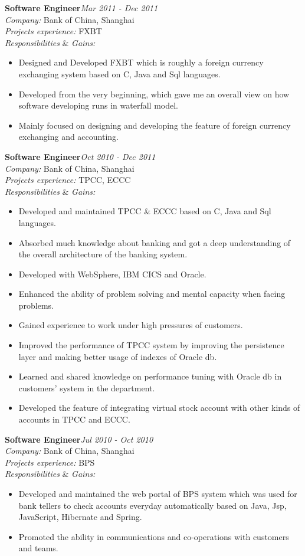 \documentclass[line, margin, 11pt]{res}
\begin{document}
\begin{resume}
{\bf Software Engineer}\hfill {\it Mar 2011 - Dec 2011}\\
{\sl Company:} Bank of China, Shanghai\\
{\sl Projects experience:} FXBT\\
{\sl Responsibilities} \& {\sl Gains:}
\begin{itemize}
\item Designed and Developed FXBT which is roughly a foreign currency exchanging system based on C, Java and Sql languages.
\item Developed from the very beginning, which gave me an overall view on how software developing runs in waterfall model.
\item Mainly focused on designing and developing the feature of foreign currency exchanging and accounting.
\end{itemize}

\pagebreak
{\bf Software Engineer}\hfill {\it Oct 2010 - Dec 2011}\\
{\sl Company:} Bank of China, Shanghai\\
{\sl Projects experience:} TPCC, ECCC\\
{\sl Responsibilities} \& {\sl Gains:}
\begin{itemize}
\item Developed and maintained TPCC \& ECCC based on C, Java and Sql languages.
\item Absorbed much knowledge about banking and got a deep understanding of the overall architecture of the banking system.
\item Developed with WebSphere, IBM CICS and Oracle.
\item Enhanced the ability of problem solving and mental capacity when facing problems.
\item Gained experience to work under high pressures of customers.
\item Improved the performance of TPCC system by improving the persistence layer and making better usage of indexes of Oracle db.
\item Learned and shared knowledge on performance tuning with Oracle db in customers' system in the department.
\item Developed the feature of integrating virtual stock account with other kinds of accounts in TPCC and ECCC.
\end{itemize}

{\bf Software Engineer}\hfill {\it Jul 2010 - Oct 2010}\\
{\sl Company:} Bank of China, Shanghai\\
{\sl Projects experience:} BPS\\
{\sl Responsibilities} \& {\sl Gains:}
\begin{itemize}
\item Developed and maintained the web portal of BPS system which was used for bank tellers to check accounts everyday automatically based on Java, Jsp, JavaScript, Hibernate and Spring.
\item Promoted the ability in communications and co-operations with customers and teams.
\end{itemize}


\end{resume}
\end{document}
